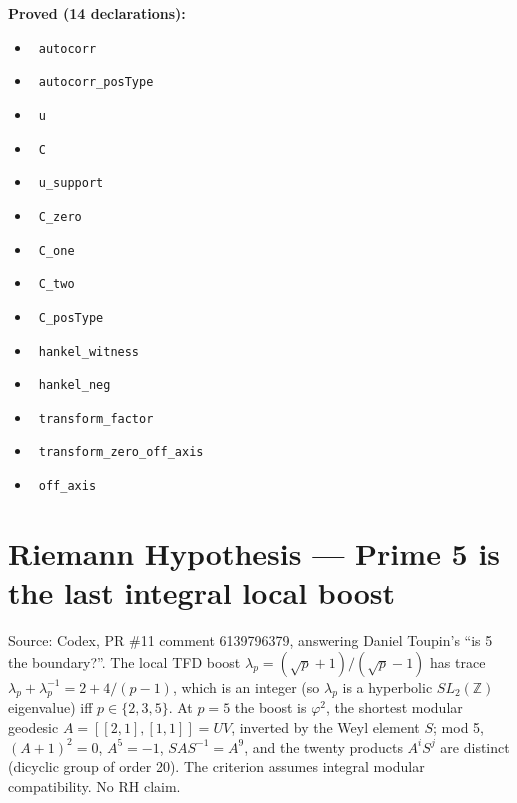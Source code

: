 \documentclass{report}
\theoremstyle{definition}
\begin{document}
\noindent\textbf{Proved (14 declarations):}
\begin{itemize}
  \item {}\leanok\ \texttt{autocorr}
  \item {}\leanok\ \texttt{autocorr\_posType}
  \item {}\leanok\ \texttt{u}
  \item {}\leanok\ \texttt{C}
  \item {}\leanok\ \texttt{u\_support}
  \item {}\leanok\ \texttt{C\_zero}
  \item {}\leanok\ \texttt{C\_one}
  \item {}\leanok\ \texttt{C\_two}
  \item {}\leanok\ \texttt{C\_posType}
  \item {}\leanok\ \texttt{hankel\_witness}
  \item {}\leanok\ \texttt{hankel\_neg}
  \item {}\leanok\ \texttt{transform\_factor}
  \item {}\leanok\ \texttt{transform\_zero\_off\_axis}
  \item {}\leanok\ \texttt{off\_axis}
\end{itemize}

\section{Riemann Hypothesis --- Prime 5 is the last integral local boost}
Source: Codex, PR \#11 comment 6139796379, answering Daniel Toupin's ``is 5 the boundary?''. The local TFD boost $\lambda_p=(\sqrt p+1)/(\sqrt p-1)$ has trace $\lambda_p+\lambda_p^{-1}=2+4/(p-1)$, which is an integer (so $\lambda_p$ is a hyperbolic $SL_2(\mathbb{Z})$ eigenvalue) iff $p\in\{2,3,5\}$. At $p=5$ the boost is $\varphi^2$, the shortest modular geodesic $A=[[2,1],[1,1]]=UV$, inverted by the Weyl element $S$; mod 5, $(A+1)^2=0$, $A^5=-1$, $SAS^{-1}=A^9$, and the twenty products $A^iS^j$ are distinct (dicyclic group of order 20). The criterion assumes integral modular compatibility. No RH claim.
\end{document}
